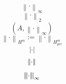 \documentclass{article}
\begin{document}
\[ \left\|\cdot\right\|_{\infty} \]
\[ \left\lVert\cdot\right\rVert_{2} \]
\[ (A,\left\|\cdot\right\|_{\infty}) \]
\[ \left\|\cdot\right\|_{H^m}:=\left\|\cdot\right\|_{H_{per}^m} \]
\[ \left|\cdot\right| \]
\[ \left|\kern-1pt\left|\cdot\right|\kern-1pt\right| \]
\[ \left|\kern-1pt\left|\kern-1pt\left|\cdot\right|\kern-1pt\right|\kern-1pt\right|_{\infty} \]
\end{document}
